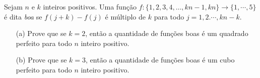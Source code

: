 Sejam $n$ e $k$ inteiros positivos. Uma função $f : \{1, 2, 3, 4, \dots , kn - 1, kn\} \to \{1, \cdots , 5\}$ é dita \textit{boa} se $f(j + k) - f(j)$ é múltiplo de $k$ para todo $j = 1, 2. \cdots , kn - k$.

\begin{itemize}
	\item[(a)] Prove que se $k = 2$, então a quantidade de funções boas é um quadrado perfeito para todo $n$ inteiro positivo.
	\item[(b)] Prove que se $k = 3$, então a quantidade de funções boas é um cubo perfeito para todo $n$ inteiro positivo.
\end{itemize}